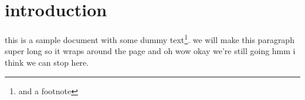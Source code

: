 \documentclass[twocolumn]{article}
\begin{document}
\section{introduction}

this is a sample document with some dummy text\footnote{and a footnote}. we will make this paragraph super long so it wraps around the page and oh wow okay we're still going hmm i think we can stop here. 
\end{document}
